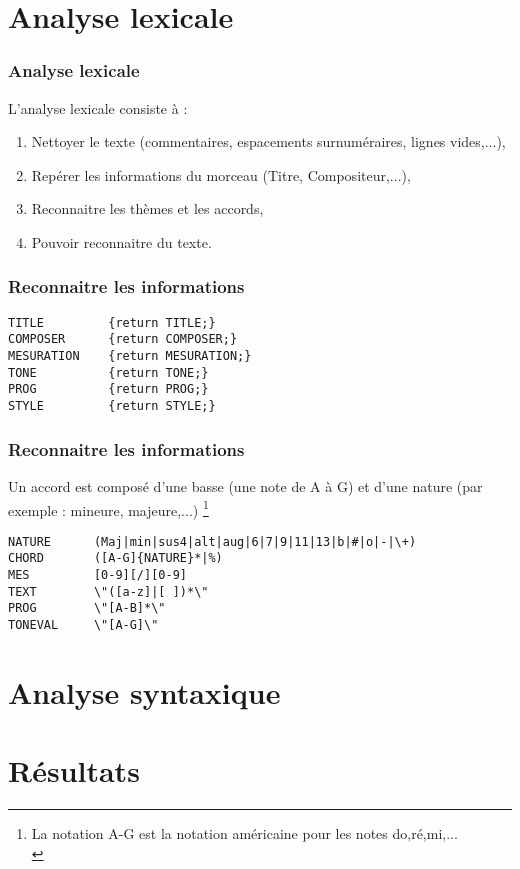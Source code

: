 \documentclass{beamer}
\begin{document}
\section{Analyse lexicale}
\begin{frame}
\frametitle{Analyse lexicale}
L'analyse lexicale consiste à :
\begin{enumerate}
\item Nettoyer le texte (commentaires, espacements surnuméraires, lignes vides,...),\\
\item Repérer les informations du morceau (Titre, Compositeur,...),\\
\item Reconnaitre les thèmes et les accords,\\
\item Pouvoir reconnaitre du texte.
\end{enumerate}
\end{frame}

\begin{frame}[fragile]
\frametitle{Reconnaitre les informations}
\begin{tiny}
\begin{verbatim}
TITLE         {return TITLE;}
COMPOSER      {return COMPOSER;}
MESURATION    {return MESURATION;}
TONE          {return TONE;}
PROG          {return PROG;}
STYLE         {return STYLE;}
\end{verbatim}
\end{tiny}
\end{frame}

\begin{frame}[fragile]
\frametitle{Reconnaitre les informations}
Un accord est composé d'une basse (une note de A à G) et d'une nature (par exemple : mineure, majeure,...)
\footnote{\tiny{La notation A-G est la notation américaine pour les notes do,ré,mi,...}\\}
\begin{tiny}
\begin{verbatim}
NATURE      (Maj|min|sus4|alt|aug|6|7|9|11|13|b|#|o|-|\+)
CHORD       ([A-G]{NATURE}*|%)
MES         [0-9][/][0-9]
TEXT        \"([a-z]|[ ])*\"
PROG        \"[A-B]*\"
TONEVAL     \"[A-G]\"
\end{verbatim}
\end{tiny}
\end{frame}




\section{Analyse syntaxique}
\begin{frame}

\end{frame}

\section{Résultats}
\begin{frame}

\end{frame}
\end{document}
